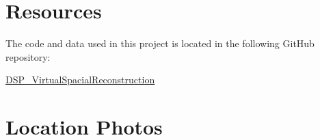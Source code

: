 \documentclass[letterpaper, 11pt, onecolumn, oneside]{article}
\begin{document}
\clearpage
\begin{appendix}
\section{Resources}
\label{appendix:resources}
The code and data used in this project is located in the following GitHub repository:

\href{https://github.com/WhoFama24/DSP_VirtualSpacialReconstruction}{DSP\_VirtualSpacialReconstruction}

\section{Location Photos}
\label{appendix:locationPhotos}
%
%
%
%
\end{appendix}

\clearpage


\end{document}
